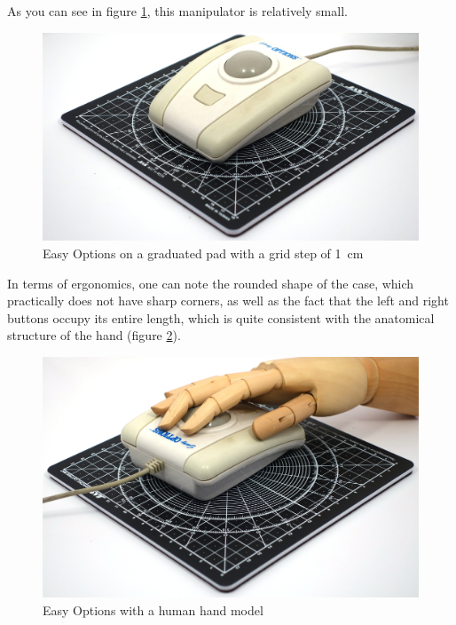\documentclass[11pt, a4paper]{article}
\begin{document}
As you can see in figure \ref{fig:EasyOptionsSize}, this manipulator is relatively small.

\begin{figure}[h]
    \centering
    \includegraphics[scale=0.35]{1993_easy_options_trackball/size_30.jpg}
    \caption{Easy Options on a graduated pad with a grid step of 1~cm}
    \label{fig:EasyOptionsSize}
\end{figure}

In terms of ergonomics, one can note the rounded shape of the case, which practically does not have sharp corners, as well as the fact that the left and right buttons occupy its entire length, which is quite consistent with the anatomical structure of the hand (figure \ref{fig:EasyOptionsHand}).

\begin{figure}[h]
    \centering
    \includegraphics[scale=0.35]{1993_easy_options_trackball/hand_30.jpg}
    \caption{Easy Options with a human hand model}
    \label{fig:EasyOptionsHand}
\end{figure}
\end{document}
